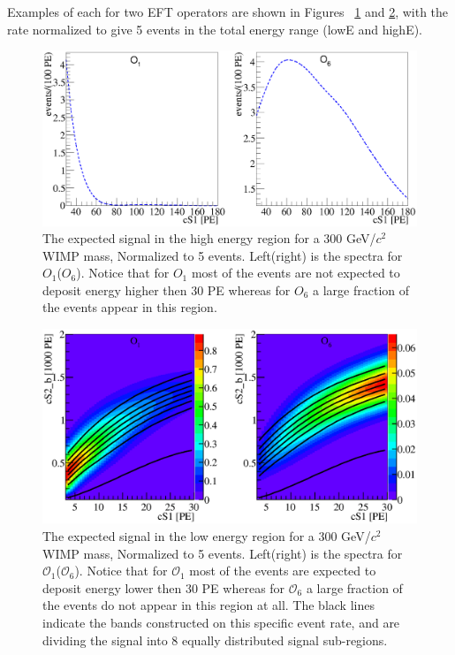 Examples of each for two EFT operators are shown in Figures ~\ref{fig:HighE} and \ref{fig:LowE}, with the rate normalized to give 5 events in the total energy range (lowE and highE).

\begin{figure}[h!]
\begin{minipage}{1.\linewidth}
\centerline{\includegraphics[width=1.\linewidth]{Figures/SigHighO1O6.eps}}
\end{minipage}
\caption{The expected signal in the high energy region for a 300 GeV/$c^2$ WIMP mass, Normalized to 5 events. Left(right) is the spectra for $O_1$($O_6$). Notice that for $O_1$ most of the events are not expected to deposit energy higher then 30 PE whereas for $O_6$ a large fraction of the events appear in this region.}
\label{fig:HighE}
\end{figure} 

\begin{figure}[h!]
\begin{minipage}{1.\linewidth}
\centerline{\includegraphics[width=1.\linewidth]{Figures/SigLowO1O6.eps}}
\end{minipage}
\caption{The expected signal in the low energy region for a 300 GeV/$c^2$ WIMP mass, Normalized to 5 events. Left(right) is the spectra for $\mathcal{O}_1$($\mathcal{O}_6$). Notice that for $\mathcal{O}_1$ most of the events are expected to deposit energy lower then 30 PE whereas for $\mathcal{O}_6$ a large fraction of the events do not appear in this region at all. The black lines indicate the bands constructed on this specific event rate, and are dividing the signal into 8 equally distributed signal sub-regions.}
\label{fig:LowE}
\end{figure}




